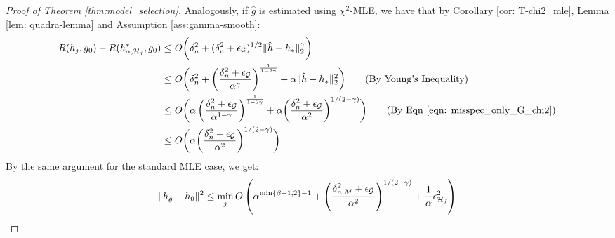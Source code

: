 \begin{proof}[Proof of Theorem \ref{thm:model_selection}]
Analogously, if $\hat{g}$ is estimated using $\chi^2$-MLE, we have that by Corollary \ref{cor: T-chi2_mle}, Lemma \ref{lem: quadra-lemma} and Assumption \ref{ass:gamma-smooth}:
\begin{align*}
    R(h_{j},g_0) -R(h_{\alpha,\Hcal_{j}}^*,g_0) \leq~& O\bigg(\delta_{n}^2+ (\delta_{n}^2 +\epsilon_\Gcal )^{1/2}\|\hat{h} - h_*\|_2^\gamma\bigg)\\
    \leq~& O\bigg(\delta_{n}^2+ \left(\frac{\delta_{n}^2 +\epsilon_\Gcal}{\alpha^{\gamma}}\right)^{\frac{1}{1-2\gamma}} + \alpha\|\hat{h} - h_*\|_2^2\bigg) \tag{By Young's Inequality}\\
    \leq~& O\bigg(\alpha \left(\frac{\delta_{n}^2 +\epsilon_\Gcal}{\alpha^{1-\gamma}}\right)^{\frac{1}{1-2\gamma}} + \alpha\bigg(\frac{\delta_{n}^2+\epsilon_\Gcal}{\alpha^2} \bigg)^{1/(2-\gamma)}\bigg) \tag{By Eqn \ref{eqn: misspec_only_G_chi2}}\\
    \leq~& O\bigg(\alpha\bigg(\frac{\delta_{n}^2+\epsilon_\Gcal}{\alpha^2} \bigg)^{1/(2-\gamma)}\bigg)
\end{align*}
By the same argument for the standard MLE case, we get:
\begin{align*}
    \|h_{\hat{\theta}} - h_0\|^2 \leq \min_{j}O\left(\alpha^{\min\{\beta+1,2\}-1} + \left(\frac{\delta_{n,M}^2+\epsilon_{\mathcal{G}}}{\alpha^2} \right)^{1/(2-\gamma)} + \frac{1}{\alpha} \epsilon_{\mathcal{H}_j}^2\right)
\end{align*}

\end{proof}

